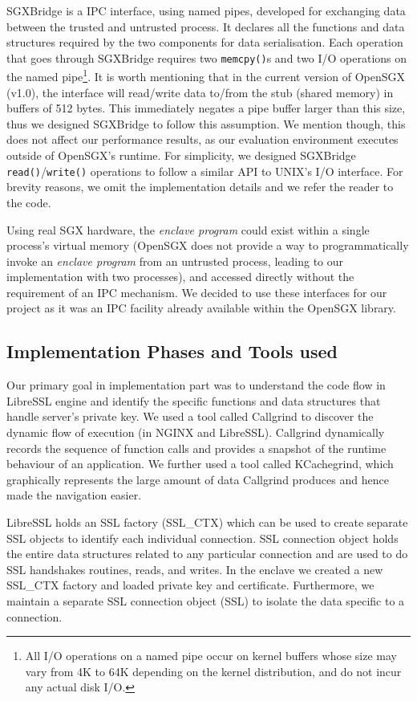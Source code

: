 \documentclass[../main.tex]{subfiles}
\begin{document}
SGXBridge is a IPC interface, using named pipes, developed for
exchanging data between the trusted and untrusted process. It declares
all the functions and data structures required by the two components
for data serialisation. Each operation that goes through SGXBridge
requires two \texttt{memcpy()}s and two I/O operations on the named
pipe\footnote{All I/O operations on a named pipe occur on kernel
  buffers whose size may vary from 4K to 64K depending on the kernel
  distribution, and do not incur any actual disk I/O.}. It is worth
mentioning that in the current version of OpenSGX (v1.0), the
interface will read/write data to/from the stub (shared memory) in
buffers of 512 bytes. This immediately negates a pipe buffer larger
than this size, thus we designed SGXBridge to follow this assumption.
We mention though, this does not affect our performance results, as
our evaluation environment executes outside of OpenSGX's runtime. For
simplicity, we designed SGXBridge \texttt{read()}/\texttt{write()}
operations to follow a similar API to UNIX's I/O interface. For
brevity reasons, we omit the implementation details and we refer the
reader to the code.

Using real SGX hardware, the \textit{enclave program} could exist
within a single process's virtual memory (OpenSGX does not provide a
way to programmatically invoke an \textit{enclave program} from an
untrusted process, leading to our implementation with two processes),
and accessed directly without the requirement of an IPC mechanism. We
decided to use these interfaces for our project as it was an IPC
facility already available within the OpenSGX library.

\subsection{Implementation Phases and Tools used}
Our primary goal in implementation part was to understand the code
flow in LibreSSL engine and identify the specific functions and data
structures that handle server's private key. We used a tool called
Callgrind to discover the dynamic flow of execution (in NGINX and
LibreSSL). Callgrind dynamically records the sequence of function
calls and provides a snapshot of the runtime behaviour of an
application. We further used a tool called KCachegrind, which
graphically represents the large amount of data Callgrind produces and
hence made the navigation easier.
 
LibreSSL holds an SSL factory (SSL\_CTX) which can be used to create
separate SSL objects to identify each individual connection. SSL
connection object holds the entire data structures related to any
particular connection and are used to do SSL handshakes routines,
reads, and writes. In the enclave we created a new SSL\_CTX factory
and loaded private key and certificate. Furthermore, we maintain a
separate SSL connection object (SSL) to isolate the data specific to a
connection.
 
\end{document}
